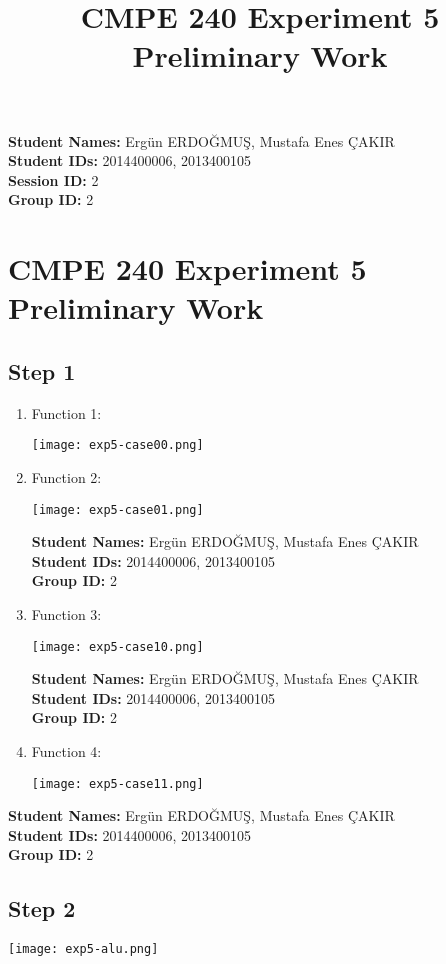 \documentclass[12pt,a4paper]{report}
\title{CMPE 240 Experiment 5 Preliminary Work}
\begin{document}
\noindent
\textbf{Student Names:} Ergün ERDOĞMUŞ, Mustafa Enes ÇAKIR \\
\textbf{Student IDs:} 2014400006, 2013400105 \\
\textbf{Session ID: } 2\\
\textbf{Group ID:} 2

\section*{CMPE 240 Experiment 5 Preliminary Work}

\subsection*{Step 1}
\begin{enumerate}
	\item Function 1:
	\begin{center}
		\texttt{[image: exp5-case00.png]}
	\end{center}

	\item Function 2:
	\begin{center}
		\texttt{[image: exp5-case01.png]}
	\end{center}

	\pagebreak
	\noindent
	\textbf{Student Names:} Ergün ERDOĞMUŞ, Mustafa Enes ÇAKIR \\
	\textbf{Student IDs:} 2014400006, 2013400105 \\
	\textbf{Group ID:} 2

	\item Function 3:
	\begin{center}
		\texttt{[image: exp5-case10.png]}
	\end{center}

	\pagebreak
	\noindent
	\textbf{Student Names:} Ergün ERDOĞMUŞ, Mustafa Enes ÇAKIR \\
	\textbf{Student IDs:} 2014400006, 2013400105 \\
	\textbf{Group ID:} 2

	\item Function 4:
	\begin{center}
		\texttt{[image: exp5-case11.png]}
	\end{center}

\end{enumerate}

\pagebreak
\noindent
\textbf{Student Names:} Ergün ERDOĞMUŞ, Mustafa Enes ÇAKIR \\
\textbf{Student IDs:} 2014400006, 2013400105 \\
\textbf{Group ID:} 2

\subsection*{Step 2}
\begin{center}
	\texttt{[image: exp5-alu.png]}
\end{center}
\end{document}
